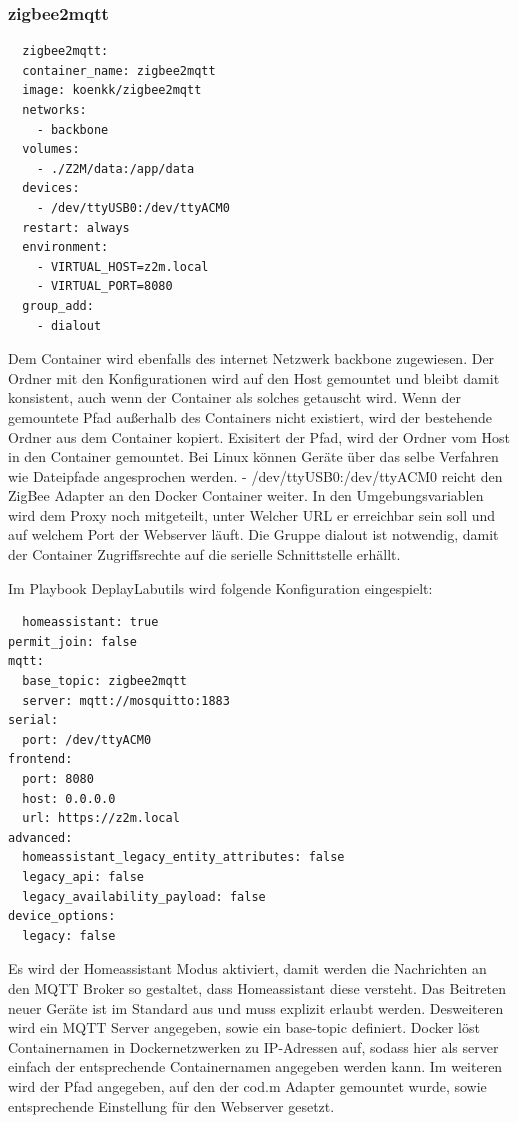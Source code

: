 \subsubsection{zigbee2mqtt}
\begin{lstlisting}
  zigbee2mqtt:
  container_name: zigbee2mqtt
  image: koenkk/zigbee2mqtt
  networks:
    - backbone
  volumes:
    - ./Z2M/data:/app/data
  devices:
    - /dev/ttyUSB0:/dev/ttyACM0
  restart: always
  environment:
    - VIRTUAL_HOST=z2m.local
    - VIRTUAL_PORT=8080
  group_add:
    - dialout
\end{lstlisting}

Dem Container wird ebenfalls des internet Netzwerk \grqq backbone \grqq{} zugewiesen. Der Ordner mit den Konfigurationen wird auf den Host gemountet und 
bleibt damit konsistent, auch wenn der Container als solches getauscht wird. Wenn der gemountete Pfad außerhalb des Containers nicht existiert, wird der 
bestehende Ordner aus dem Container kopiert. Exisitert der Pfad, wird der Ordner vom Host in den Container gemountet. 
Bei Linux können Geräte über das selbe Verfahren wie Dateipfade angesprochen werden. \grqq - /dev/ttyUSB0:/dev/ttyACM0 \grqq{} reicht den ZigBee Adapter an 
den Docker Container weiter.
In den Umgebungsvariablen wird dem Proxy noch mitgeteilt, unter Welcher URL er erreichbar sein soll und auf welchem Port der Webserver läuft. Die Gruppe 
\grqq dialout \grqq{} ist notwendig, damit der Container Zugriffsrechte auf die serielle Schnittstelle erhällt.

Im Playbook \grqq DeplayLabutils \grqq{} wird folgende Konfiguration eingespielt:
\begin{lstlisting}
  homeassistant: true
permit_join: false
mqtt:
  base_topic: zigbee2mqtt
  server: mqtt://mosquitto:1883
serial:
  port: /dev/ttyACM0
frontend:
  port: 8080
  host: 0.0.0.0
  url: https://z2m.local
advanced:
  homeassistant_legacy_entity_attributes: false
  legacy_api: false
  legacy_availability_payload: false
device_options:
  legacy: false
\end{lstlisting}

Es wird der \grqq Homeassistant \grqq{} Modus aktiviert, damit werden die Nachrichten an den MQTT Broker so gestaltet, dass \grqq Homeassistant \grqq{} diese versteht.
Das Beitreten neuer Geräte ist im Standard aus und muss explizit erlaubt werden. Desweiteren wird ein MQTT Server angegeben, sowie ein \grqq base-topic \grqq{}
definiert. Docker löst Containernamen in Dockernetzwerken zu IP-Adressen auf, sodass hier als server einfach der entsprechende Containernamen angegeben werden
kann. Im weiteren wird der Pfad angegeben, auf den der cod.m Adapter gemountet wurde, sowie entsprechende Einstellung für den Webserver gesetzt.

